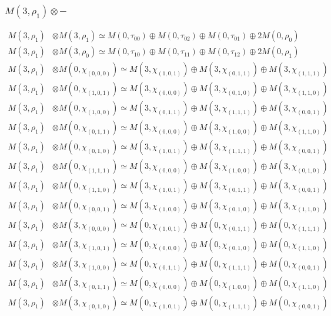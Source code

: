 \subsubsection{$ M(3,\rho_{1})\otimes -$}
\begin{align*}
M(3,\rho_{1}) &\otimes M(3,\rho_{1}) \simeq M(0,\tau_{00}) \oplus M(0,\tau_{02}) \oplus M(0,\tau_{01}) \oplus 2 M(0,\rho_{0})\\
M(3,\rho_{1}) &\otimes M(3,\rho_{0}) \simeq M(0,\tau_{10}) \oplus M(0,\tau_{11}) \oplus M(0,\tau_{12}) \oplus 2 M(0,\rho_{1})\\
M(3,\rho_{1}) &\otimes M(0,\chi_{(0,0,0)}) \simeq M(3,\chi_{(1,0,1)}) \oplus M(3,\chi_{(0,1,1)}) \oplus M(3,\chi_{(1,1,1)})\\
M(3,\rho_{1}) &\otimes M(0,\chi_{(1,0,1)}) \simeq M(3,\chi_{(0,0,0)}) \oplus M(3,\chi_{(0,1,0)}) \oplus M(3,\chi_{(1,1,0)})\\
M(3,\rho_{1}) &\otimes M(0,\chi_{(1,0,0)}) \simeq M(3,\chi_{(0,1,1)}) \oplus M(3,\chi_{(1,1,1)}) \oplus M(3,\chi_{(0,0,1)})\\
M(3,\rho_{1}) &\otimes M(0,\chi_{(0,1,1)}) \simeq M(3,\chi_{(0,0,0)}) \oplus M(3,\chi_{(1,0,0)}) \oplus M(3,\chi_{(1,1,0)})\\
M(3,\rho_{1}) &\otimes M(0,\chi_{(0,1,0)}) \simeq M(3,\chi_{(1,0,1)}) \oplus M(3,\chi_{(1,1,1)}) \oplus M(3,\chi_{(0,0,1)})\\
M(3,\rho_{1}) &\otimes M(0,\chi_{(1,1,1)}) \simeq M(3,\chi_{(0,0,0)}) \oplus M(3,\chi_{(1,0,0)}) \oplus M(3,\chi_{(0,1,0)})\\
M(3,\rho_{1}) &\otimes M(0,\chi_{(1,1,0)}) \simeq M(3,\chi_{(1,0,1)}) \oplus M(3,\chi_{(0,1,1)}) \oplus M(3,\chi_{(0,0,1)})\\
M(3,\rho_{1}) &\otimes M(0,\chi_{(0,0,1)}) \simeq M(3,\chi_{(1,0,0)}) \oplus M(3,\chi_{(0,1,0)}) \oplus M(3,\chi_{(1,1,0)})\\
M(3,\rho_{1}) &\otimes M(3,\chi_{(0,0,0)}) \simeq M(0,\chi_{(1,0,1)}) \oplus M(0,\chi_{(0,1,1)}) \oplus M(0,\chi_{(1,1,1)})\\
M(3,\rho_{1}) &\otimes M(3,\chi_{(1,0,1)}) \simeq M(0,\chi_{(0,0,0)}) \oplus M(0,\chi_{(0,1,0)}) \oplus M(0,\chi_{(1,1,0)})\\
M(3,\rho_{1}) &\otimes M(3,\chi_{(1,0,0)}) \simeq M(0,\chi_{(0,1,1)}) \oplus M(0,\chi_{(1,1,1)}) \oplus M(0,\chi_{(0,0,1)})\\
M(3,\rho_{1}) &\otimes M(3,\chi_{(0,1,1)}) \simeq M(0,\chi_{(0,0,0)}) \oplus M(0,\chi_{(1,0,0)}) \oplus M(0,\chi_{(1,1,0)})\\
M(3,\rho_{1}) &\otimes M(3,\chi_{(0,1,0)}) \simeq M(0,\chi_{(1,0,1)}) \oplus M(0,\chi_{(1,1,1)}) \oplus M(0,\chi_{(0,0,1)})\\

\end{align*}

